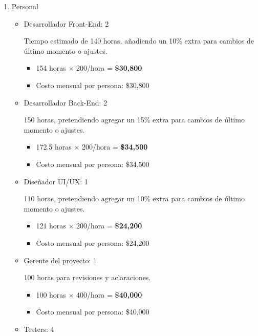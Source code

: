 \documentclass[12pt]{article}
\begin{document}
    \begin{enumerate}
	\item Personal

	\begin{itemize}
		\item Desarrollador Front-End: 2 

        Tiempo estimado de 140 horas, añadiendo un 10\% extra para cambios de último momento o ajustes.
        \begin{itemize}
            \item 154 horas $\times$ 200/hora = \textbf{\$30,800}
            \item Costo mensual por persona: \$30,800
        \end{itemize}	

     
		\item Desarrollador Back-End: 2 

           150 horas, pretendiendo agregar un 15\% extra para cambios de último momento o ajustes.
            \begin{itemize}
            \item 172.5 horas $\times$ 200/hora = \textbf{\$34,500}
            \item Costo mensual por persona: \$34,500
            \end{itemize}	

        \item Diseñador UI/UX: 1 

           110 horas, pretendiendo agregar un 10\% extra para cambios de último momento o ajustes.
            \begin{itemize}
            \item 121 horas $\times$ 200/hora = \textbf{\$24,200}
            \item Costo mensual por persona: \$24,200
            \end{itemize}

		\item Gerente del proyecto: 1

            100 horas para revisiones y aclaraciones.
            \begin{itemize}
            \item 100 horas $\times$ 400/hora = \textbf{\$40,000}
            \item Costo mensual por persona: \$40,000
            \end{itemize}	

		\item Testers: 4
	

\end{itemize}
\end{enumerate}
\end{document}
